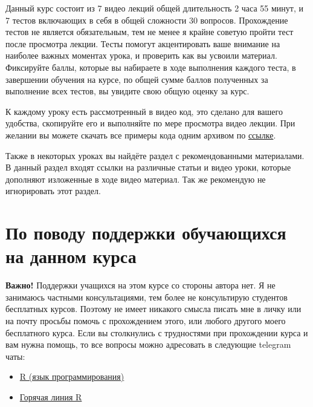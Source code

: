 \documentclass[
]{book}
\providecommand{\tightlist}{%
  \setlength{\itemsep}{0pt}\setlength{\parskip}{0pt}}
\begin{document}
Данный курс состоит из 7 видео лекций общей длительность 2 часа 55 минут, и 7 тестов включающих в себя в общей сложности 30 вопросов. Прохождение тестов не является обязательным, тем не менее я крайне советую пройти тест после просмотра лекции. Тесты помогут акцентировать ваше внимание на наиболее важных моментах урока, и проверить как вы усвоили материал. Фиксируйте баллы, которые вы набираете в ходе выполнения каждого теста, в завершении обучения на курсе, по общей сумме баллов полученных за выполнение всех тестов, вы увидите свою общую оценку за курс.

К каждому уроку есть рассмотренный в видео код, это сделано для вашего удобства, скопируйте его и выполняйте по мере просмотра видео лекции. При желании вы можете скачать все примеры кода одним архивом по \href{https://github.com/selesnow/publications/blob/master/code_example/iterations_in_r_scripts.zip?raw=true}{ссылке}.

Также в некоторых уроках вы найдёте раздел с рекомендованными материалами. В данный раздел входят ссылки на различные статьи и видео уроки, которые дополняют изложенные в ходе видео материал. Так же рекомендую не игнорировать этот раздел.

\hypertarget{ux43fux43e-ux43fux43eux432ux43eux434ux443-ux43fux43eux434ux434ux435ux440ux436ux43aux438-ux43eux431ux443ux447ux430ux44eux449ux438ux445ux441ux44f-ux43dux430-ux434ux430ux43dux43dux43eux43c-ux43aux443ux440ux441ux430}{%
\section*{По поводу поддержки обучающихся на данном курса}\label{ux43fux43e-ux43fux43eux432ux43eux434ux443-ux43fux43eux434ux434ux435ux440ux436ux43aux438-ux43eux431ux443ux447ux430ux44eux449ux438ux445ux441ux44f-ux43dux430-ux434ux430ux43dux43dux43eux43c-ux43aux443ux440ux441ux430}}

\textbf{Важно!} Поддержки учащихся на этом курсе со стороны автора нет. Я не занимаюсь частными консультациями, тем более не консультирую студентов бесплатных курсов. Поэтому не имеет никакого смысла писать мне в личку или на почту просьбы помочь с прохождением этого, или любого другого моего бесплатного курса. Если вы столкнулись с трудностями при прохождении курса и вам нужна помощь, то все вопросы можно адресовать в следующие telegram чаты:

\begin{itemize}
\tightlist
\item
  \href{https://t.me/rlang_ru}{R (язык программирования)}
\item
  \href{https://t.me/hotlineR_EU}{Горячая линия R}
\end{itemize}
\end{document}
